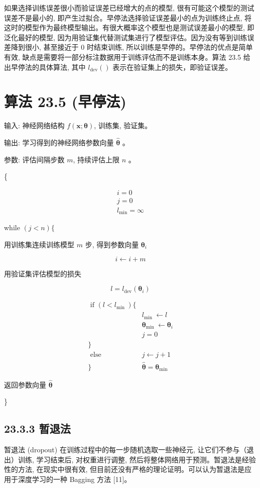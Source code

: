\documentclass[10pt]{article}
\begin{document}
\begin{CJK*}{UTF8}{bsmi}
如果选择训练误差很小而验证误差已经增大的点的模型, 很有可能这个模型的测试误差不是最小的, 即产生过拟合。早停法选择验证误差最小的点为训练终止点, 将这时的模型作为最终模型输出。有很大概率这个模型也是测试误差最小的模型, 即泛化最好的模型, 因为用验证集代替测试集进行了模型评估。因为没有等到训练误差降到很小, 甚至接近于 0 时结束训练, 所以训练是早停的。早停法的优点是简单有效, 缺点是需要将一部分标注数据用于训练评估而不是训练本身。算法 23.5 给出早停法的具体算法, 其中 $l_{\operatorname{dev}}()$ 表示在验证集上的损失，即验证误差。

\section*{算法 23.5 (早停法)}
输入: 神经网络结构 $f(\boldsymbol{x} ; \boldsymbol{\theta})$, 训练集, 验证集。

输出: 学习得到的神经网络参数向量 $\hat{\boldsymbol{\theta}}$ 。

参数: 评估间隔步数 $m$, 持续评估上限 $n$ 。

\{

$$
\begin{gathered}
i=0 \\
j=0 \\
l_{\min }=\infty
\end{gathered}
$$

while $(j<n)\{$

用训练集连续训练模型 $m$ 步, 得到参数向量 $\boldsymbol{\theta}_{i}$

$$
i \leftarrow i+m
$$

用验证集评估模型的损失

$$
l=l_{\operatorname{dev}}\left(\boldsymbol{\theta}_{i}\right)
$$

$$
\begin{array}{lc}
\text { if }\left(l<l_{\text {min }}\right)\{ & \\
& l_{\text {min }} \leftarrow l \\
& \boldsymbol{\theta}_{\text {min }} \leftarrow \boldsymbol{\theta}_{i} \\
& j=0 \\
\} & \\
\text { else } & j \leftarrow j+1 \\
\} & \hat{\boldsymbol{\theta}}=\boldsymbol{\theta}_{\text {min }}
\end{array}
$$

返回参数向量 $\hat{\boldsymbol{\theta}}$

\}

\subsection*{23.3.3 暂退法}
暂退法 (dropout) 在训练过程中的每一步随机选取一些神经元, 让它们不参与（退出）训练, 学习结束后, 对权重进行调整, 然后将整体网络用于预测。暂退法是经验性的方法, 在现实中很有效, 但目前还没有严格的理论证明。可以认为暂退法是应用于深度学习的一种 Bagging 方法 [11]。


\end{CJK*}
\end{document}
